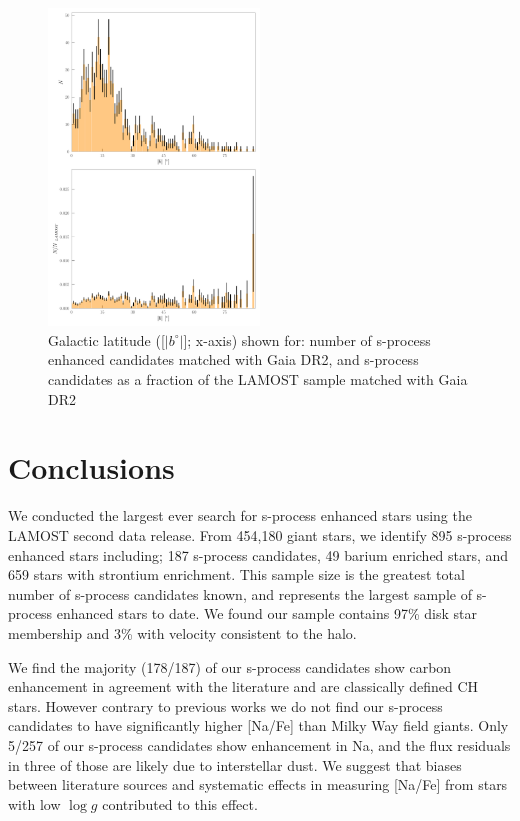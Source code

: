 \documentclass[a4paper,fleqn,usenatbib]{mnras}
\begin{document}
\begin{figure}
	\includegraphics[width=0.5\textwidth]{histogram.pdf}
	\caption{Galactic latitude ([$|b^{\circ}|$]; x-axis) shown for: number of s-process enhanced candidates matched with Gaia DR2, and s-process candidates as a fraction of the LAMOST sample matched with Gaia DR2}
	\label{fig:figure5}
\end{figure}

\section{Conclusions} \label{sec:con}

We conducted the largest ever search for s-process enhanced stars using the LAMOST second data release. From 454,180 giant stars, we identify 895 s-process enhanced stars including; 187 s-process candidates, 49 barium enriched stars, and 659 stars with strontium enrichment. This sample size is the greatest total number of s-process candidates known, and represents the largest sample of s-process enhanced stars to date.  We found our sample contains 97\% disk star membership and 3\% with velocity consistent to the halo.

We find the majority (178/187) of our s-process candidates show carbon enhancement in agreement with the literature and are classically defined CH stars. However contrary to previous works we do not find our s-process candidates to have significantly higher [Na/Fe] than Milky Way field giants. Only 5/257 of our s-process candidates show enhancement in Na, and the flux residuals in three of those are likely due to interstellar dust. We suggest that biases between literature sources and systematic effects in measuring [Na/Fe] from stars with low $\log{g}$ contributed to this effect. 
\end{document}
